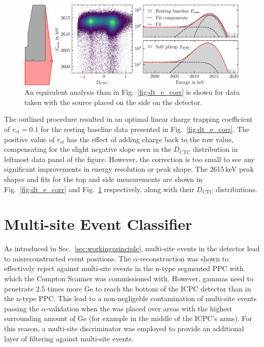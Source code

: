 \begin{figure}[htb]
    \centering
    \includegraphics[width=6in]{figs/param/dt_e_corr_side.png}
    \caption{An equivalent analysis than in Fig.~\ref{fig:dt_e_corr} is shown for data taken with the \ThS{} source placed on the side on the detector.}
    \label{fig:dt_e_corr_side}
\end{figure}

The outlined procedure resulted in an optimal linear charge trapping coefficient of $r_{ct} = 0.1$ for the resting baseline data presented in Fig.~\ref{fig:dt_e_corr}. The positive value of $r_{ct}$ has the effect of adding charge back to the raw value, compensating for the slight negative slope seen in the $D_\text{CTC}$ distribution in leftmost data panel of the figure. However, the correction is too small to see any significant improvements in energy resolution or peak shape. The 2615\,keV peak shapes and fits for the top and side \ThS{} measurements are shown in Fig.~\ref{fig:dt_e_corr} and Fig.~\ref{fig:dt_e_corr_side} respectively, along with their $D_\text{CTC}$ distributions. 

\section{Multi-site Event Classifier}\label{sec:avse}

As introduced in Sec.~\ref{sec:workingprinciple}, multi-site events in the detector lead to misreconstructed event positions. The $\alpha$-reconstruction was shown to effectively reject against multi-site events in the n-type segmented PPC with which the Compton Scanner was commissioned with. However, gammas need to penetrate 2.5 times more Ge to reach the bottom of the ICPC detector than in the n-type PPC. This lead to a non-negligeble contamination of multi-site events passing the $\alpha$-validation when the \CsS{} was placed over areas with the highest surrounding amount of Ge (for example in the middle of the ICPC's arms). For this reason, a multi-site discriminator was employed to provide an additional layer of filtering against multi-site events. 

